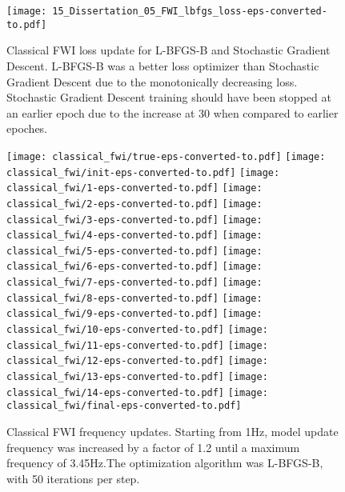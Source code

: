 \begin{figure}[!ht]
        \centering
        \texttt{[image: 15\_Dissertation\_05\_FWI\_lbfgs\_loss-eps-converted-to.pdf]}
        \caption[Classical FWI loss update.]{Classical FWI loss update for L-BFGS-B and Stochastic Gradient Descent. L-BFGS-B was a better loss optimizer than Stochastic Gradient Descent due to the monotonically decreasing loss. Stochastic Gradient Descent training should have been stopped at an earlier epoch due to the increase at 30 when compared to earlier epoches.}
        \label{fig:app_classical_fwi_loss}
\end{figure}

\begin{figure}[ht]
    \centering
    \texttt{[image: classical\_fwi/true-eps-converted-to.pdf]}
    \texttt{[image: classical\_fwi/init-eps-converted-to.pdf]}
    \texttt{[image: classical\_fwi/1-eps-converted-to.pdf]}
    \texttt{[image: classical\_fwi/2-eps-converted-to.pdf]}
    \texttt{[image: classical\_fwi/3-eps-converted-to.pdf]}
    \texttt{[image: classical\_fwi/4-eps-converted-to.pdf]}
    \texttt{[image: classical\_fwi/5-eps-converted-to.pdf]}
    \texttt{[image: classical\_fwi/6-eps-converted-to.pdf]}
    \texttt{[image: classical\_fwi/7-eps-converted-to.pdf]}
    \texttt{[image: classical\_fwi/8-eps-converted-to.pdf]}
    \texttt{[image: classical\_fwi/9-eps-converted-to.pdf]}
    \texttt{[image: classical\_fwi/10-eps-converted-to.pdf]}
    \texttt{[image: classical\_fwi/11-eps-converted-to.pdf]}
    \texttt{[image: classical\_fwi/12-eps-converted-to.pdf]}
    \texttt{[image: classical\_fwi/13-eps-converted-to.pdf]}
    \texttt{[image: classical\_fwi/14-eps-converted-to.pdf]}
    \texttt{[image: classical\_fwi/final-eps-converted-to.pdf]}
    \caption[Classical FWI frequency updates.]{Classical FWI frequency updates. Starting from 1\si{Hz}, model update frequency was increased by a factor of 1.2 until a maximum frequency of 3.45\si{Hz}.The optimization algorithm was L-BFGS-B, with 50 iterations per step.}
    \label{fig:classical_fwi_progression}
\end{figure}

